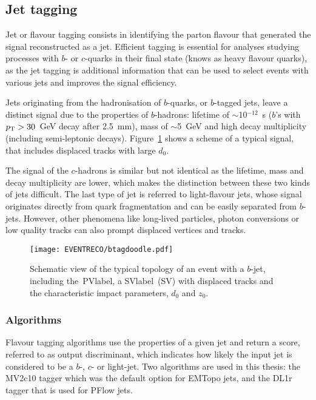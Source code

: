 \subsection{Jet tagging}

Jet or flavour tagging consists in identifying the parton flavour that generated the signal reconstructed as a jet. Efficient tagging is essential for analyses studying processes with $b$- or $c$-quarks in their final state (knows as heavy flavour quarks), as the jet tagging is additional information that can be used to select events with various jets and improves the signal efficiency.

Jets originating from the hadronisation of $b$-quarks, or $b$-tagged jets, leave a distinct signal due to the properties of $b$-hadrons: lifetime of $\sim$10$^{-12}$~s ($b$'s with $p_{\text{T}}>30$~GeV decay after 2.5~mm), mass of $\sim$5~GeV and high decay multiplicity (including semi-leptonic decays). Figure~\ref{figEVNTRECO:BTAGTOPO} shows a scheme of a typical signal, that includes displaced tracks with large $d_0$.

The signal of the $c$-hadrons is similar but not identical as the lifetime, mass and decay multiplicity are lower, which makes the distinction between these two kinds of jets difficult. The last type of jet is referred to light-flavour jets, whose signal originates directly from quark fragmentation and can be easily separated from $b$-jets. However, other phenomena like long-lived particles, photon conversions or low quality tracks can also prompt displaced vertices and tracks.

\begin{figure}[htbp]
    \RawFloats
    \begin{center}
    \texttt{[image: EVENTRECO/btagdoodle.pdf]}
    \caption{
        Schematic view of the typical topology of an event with a $b$-jet, including the~\acrshort{PVlabel}, a \acrlong{SVlabel}~(\acrshort{SV}) with displaced tracks and the characteristic impact parameters, $d_0$ and $z_0$.
    }
    \label{figEVNTRECO:BTAGTOPO}
    \end{center}
\end{figure}

\subsubsection{Algorithms}

Flavour tagging algorithms use the properties of a given jet and return a score, referred to as output discriminant, which indicates how likely the input jet is considered to be a $b$-, $c$- or light-jet. Two algorithms are used in this thesis: the MV2c10 tagger which was the default option for EMTopo jets, and the DL1r tagger that is used for PFlow jets.

